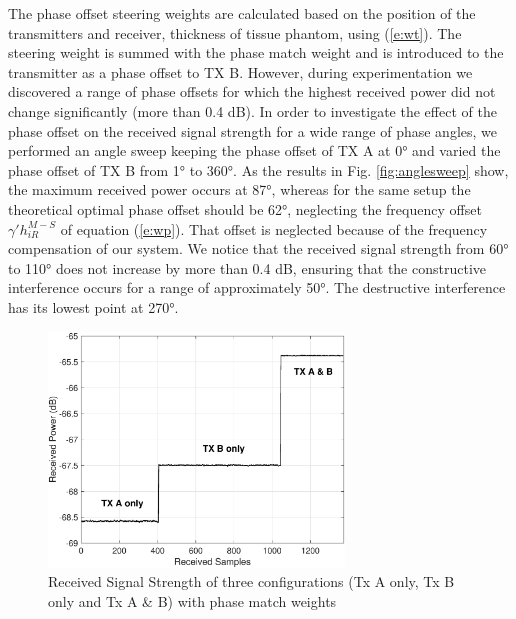 The phase offset steering weights are calculated based on the position of the transmitters and receiver, thickness of tissue phantom, using (\ref{e:wt}). The steering weight is summed with the phase match weight and is introduced to the transmitter as a phase offset to TX B. However, during experimentation we discovered a range of phase offsets for which the highest received power did not change significantly (more than 0.4 dB). In order to investigate the effect of the phase offset on the received signal strength for a wide range of phase angles, we performed an angle sweep keeping the phase offset of TX A at \ang{0} and varied the phase offset of TX B from \ang{1} to \ang{360}. As the results in Fig. \ref{fig:anglesweep} show, the maximum received power occurs at \ang{87}, whereas for the same setup the theoretical optimal phase offset should be \ang{62}, neglecting the frequency offset $\gamma' h_{iR}^{M-S} $ of equation (\ref{e:wp}). That offset is neglected because of the frequency compensation of our system. We notice that the received signal strength from \ang{60} to \ang{110} does not increase by more than 0.4 dB, ensuring that the constructive interference occurs for a range of approximately \ang{50}. The destructive interference has its lowest point at \ang{270}.

 \begin{figure}[t]
	\centering
	\includegraphics[width=0.7\textwidth]{figures/GC_beamforming//RSSI_curve_80.eps} 
	\caption{\label{fig:RSSI} Received Signal Strength of three configurations (Tx A only, Tx B only and Tx A \& B) with phase match weights} \vspace{-2mm}
\vspace{-3mm}
\end{figure}

